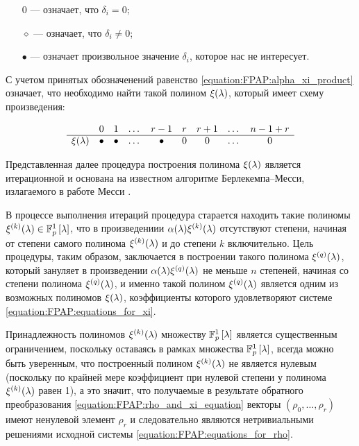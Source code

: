 \begin{itemize}
	\item [0] --- означает, что $\delta_i = 0$;
	\item [$\diamond$] --- означает, что $\delta_i \neq 0$;
	\item [$\bullet$] --- означает произвольное значение $\delta_i$, которое нас не интересует.
\end{itemize}

С учетом принятых обозначенений равенство \eqref{equation:FPAP:alpha_xi_product} означает, что необходимо найти такой полином
$\xi (\lambda)$, который имеет схему произведения:

	$$
		\begin{array}{ccccccccc}
			                 & 0       & 1       & \dots & r-1     & r & r+1 & \dots & n-1+r \\
			\hline
			\xi (\lambda) & \bullet & \bullet & \dots & \bullet & 0 & 0   & \dots & 0 \\
		\end{array}
	$$

Представленная далее процедура построения полинома $\xi (\lambda)$ является итерационной и основана на известном алгоритме Берлекемпа--Месси,
излагаемого в работе Месси \cite{Massey}.

В процессе выполнения итераций процедура старается находить такие полиномы $\xi^{(k)} (\lambda) \in \mathbb{F}_p^1 \left [ \lambda \right ]$,
что в произведениии $\alpha (\lambda) \xi^{(k)} (\lambda)$ отсутствуют степени, начиная от степени самого полинома $\xi^{(k)} (\lambda)$
и до степени $k$ включительно. Цель процедуры, таким образом, заключается в построении такого полинома $\xi^{(q)} (\lambda)$, который
зануляет в произведении $\alpha (\lambda) \xi^{(q)} (\lambda)$ не меньше $n$ степеней, начиная со степени полинома $\xi^{(q)} (\lambda)$,
и именно такой полином $\xi^{(q)} (\lambda)$ является одним из возможных полиномов $\xi (\lambda)$, коэффициенты которого удовлетворяют
системе \eqref{equation:FPAP:equations_for_xi}.

Принадлежность полиномов $\xi^{(k)} (\lambda)$ множеству $\mathbb{F}_p^1 \left [ \lambda \right ]$ является существенным ограничением, поскольку оставаясь
в рамках множества $\mathbb{F}_p^1 \left [ \lambda \right ]$, всегда можно быть уверенным, что построенный полином $\xi^{(k)} (\lambda)$ не является нулевым
(поскольку по крайней мере коэффициент при нулевой степени у полинома $\xi^{(k)} (\lambda)$ равен 1), а это значит, что получаемые в результате
обратного преобразования \eqref{equation:FPAP:rho_and_xi_equation} векторы $(\rho_0, \dots, \rho_r)$ имеют ненулевой элемент $\rho_r$ и
следовательно являются нетривиальными решениями исходной системы \eqref{equation:FPAP:equations_for_rho}.

